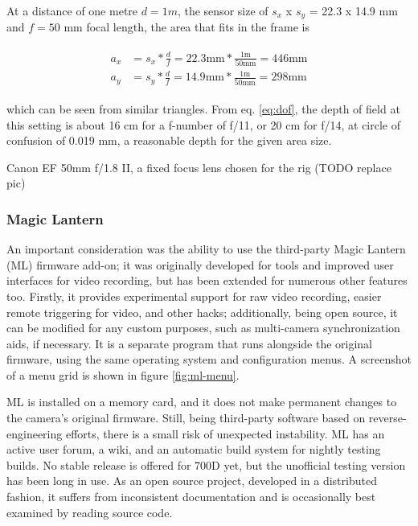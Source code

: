 At a distance of one metre $d = 1 m$, the sensor size of $s_x$ x $s_y$ = 22.3 x 14.9 mm and $f = 50$ mm focal length, the area that fits in the frame is

\begin{align} \label{equ:areasize} \begin{split}
	a_x &= s_x * \frac{d}{f} = 22.3 \text{mm} * \frac{1 \text{m}}{50 \text{mm}} = 446 \text{mm}\\
	a_y &= s_y * \frac{d}{f} = 14.9 \text{mm} * \frac{1 \text{m}}{50 \text{mm}} = 298 \text{mm}
\end{split} \end{align}

which can be seen from similar triangles.
From eq. \ref{eq:dof}, the depth of field at this setting is about 16 cm for a f-number of f/11, or 20 cm for f/14, at circle of confusion of 0.019 mm, a reasonable depth for the given area size.

{Canon EF 50mm f/1.8 II, a fixed focus lens chosen for the rig (TODO replace pic)}

\subsubsection{Magic Lantern}

An important consideration was the ability to use the third-party Magic Lantern (ML) firmware add-on;
it was originally developed for tools and improved user interfaces for video recording, but has been extended for numerous other features too.
Firstly, it provides experimental support for raw video recording, easier remote triggering for video, and other hacks;
additionally, being open source, it can be modified for any custom purposes, such as multi-camera synchronization aids, if necessary.
It is a separate program that runs alongside the original firmware, using the same operating system and configuration menus.
A screenshot of a menu grid is shown in figure \ref{fig:ml-menu}.

ML is installed on a memory card, and it does not make permanent changes to the camera's original firmware.
Still, being third-party software based on reverse-engineering efforts, there is a small risk of unexpected instability.
ML has an active user forum, a wiki, and an automatic build system for nightly testing builds.
No stable release is offered for 700D yet, but the unofficial testing version has been long in use.
As an open source project, developed in a distributed fashion, it suffers from inconsistent documentation and is occasionally best examined by reading source code.


